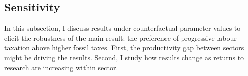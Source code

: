  
 

\subsection{Sensitivity}
In this subsection, I discuss results under counterfactual parameter values to elicit the robustness of the main result: the preference of progressive labour taxation above higher fossil taxes. 
First, the productivity gap between sectors might be driving the results. Second, I study how results change as returns to research are increasing within sector. 